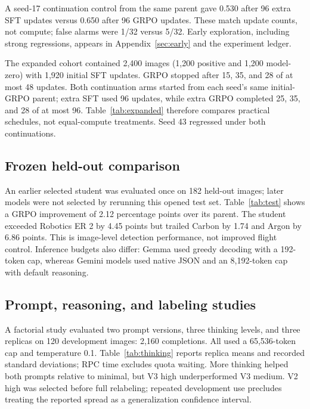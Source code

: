 \documentclass[10pt,a4paper,twocolumn]{article}
\begin{document}
A seed-17 continuation control from the same parent gave 0.530 after 96 extra SFT updates versus 0.650 after 96 GRPO updates. These match update counts, not compute; false alarms were 1/32 versus 5/32. Early exploration, including strong regressions, appears in Appendix~\ref{sec:early} and the experiment ledger.

The expanded cohort contained 2,400 images (1,200 positive and 1,200 model-zero) with 1,920 initial SFT updates. GRPO stopped after 15, 35, and 28 of at most 48 updates. Both continuation arms started from each seed's same initial-GRPO parent; extra SFT used 96 updates, while extra GRPO completed 25, 35, and 28 of at most 96. Table~\ref{tab:expanded} therefore compares practical schedules, not equal-compute treatments. Seed 43 regressed under both continuations.

\begin{table}[ht]\centering\small\caption{2,400-image cohort: development F$_2$. Continuation compute and completed GRPO updates differ.}\label{tab:expanded}\end{table}

\subsection{Frozen held-out comparison}
An earlier selected student was evaluated once on 182 held-out images; later models were not selected by rerunning this opened test set. Table~\ref{tab:test} shows a GRPO improvement of 2.12 percentage points over its parent. The student exceeded Robotics ER 2 by 4.45 points but trailed Carbon by 1.74 and Argon by 6.86 points. This is image-level detection performance, not improved flight control. Inference budgets also differ: Gemma used greedy decoding with a 192-token cap, whereas Gemini models used native JSON and an 8,192-token cap with default reasoning.

\begin{table}[ht]\centering\small\caption{Frozen 182-image detection comparison. Identifiers are the provider/model labels in the archived manifests.}\label{tab:test}\end{table}

\subsection{Prompt, reasoning, and labeling studies}
A factorial study evaluated two prompt versions, three thinking levels, and three replicas on 120 development images: 2,160 completions. All used a 65,536-token cap and temperature 0.1. Table~\ref{tab:thinking} reports replica means and recorded standard deviations; RPC time excludes quota waiting. More thinking helped both prompts relative to minimal, but V3 high underperformed V3 medium. V2 high was selected before full relabeling; repeated development use precludes treating the reported spread as a generalization confidence interval.
\end{document}
